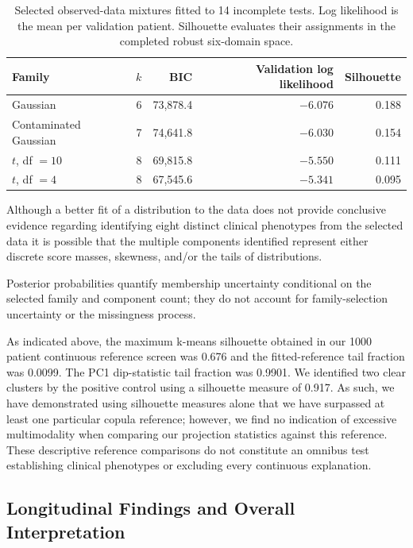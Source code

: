 \begin{table}[htbp]
\centering\small
\caption{Selected observed-data mixtures fitted to 14 incomplete tests. Log likelihood is the mean per validation patient. Silhouette evaluates their assignments in the completed robust six-domain space.}
\label{tab:extension_mixtures}
\begin{tabular}{lrrrr}
\toprule
Family & $k$ & BIC & Validation log likelihood & Silhouette \\
\midrule
Gaussian & 6 & 73{,}878.4 & $-6.076$ & 0.188 \\
Contaminated Gaussian & 7 & 74{,}641.8 & $-6.030$ & 0.154 \\
$t$, df $=10$ & 8 & 69{,}815.8 & $-5.550$ & 0.111 \\
$t$, df $=4$ & 8 & 67{,}545.6 & $-5.341$ & 0.095 \\
\bottomrule
\end{tabular}
\end{table}

Although a better fit of a distribution to the data does not provide conclusive evidence regarding identifying eight distinct clinical phenotypes from the selected data it is possible that the multiple components identified represent either discrete score masses, skewness, and/or the tails of distributions.

Posterior probabilities quantify membership uncertainty conditional on the selected family and component count; they do not account for family-selection uncertainty or the missingness process.

As indicated above, the maximum k-means silhouette obtained in our 1000 patient continuous reference screen was 0.676 and the fitted-reference tail fraction was 0.0099. The PC1 dip-statistic tail fraction was 0.9901. We identified two clear clusters by the positive control using a silhouette measure of 0.917. As such, we have demonstrated using silhouette measures alone that we have surpassed at least one particular copula reference; however, we find no indication of excessive multimodality when comparing our projection statistics against this reference. These descriptive reference comparisons do not constitute an omnibus test establishing clinical phenotypes or excluding every continuous explanation.

\subsection{Longitudinal Findings and Overall Interpretation}

